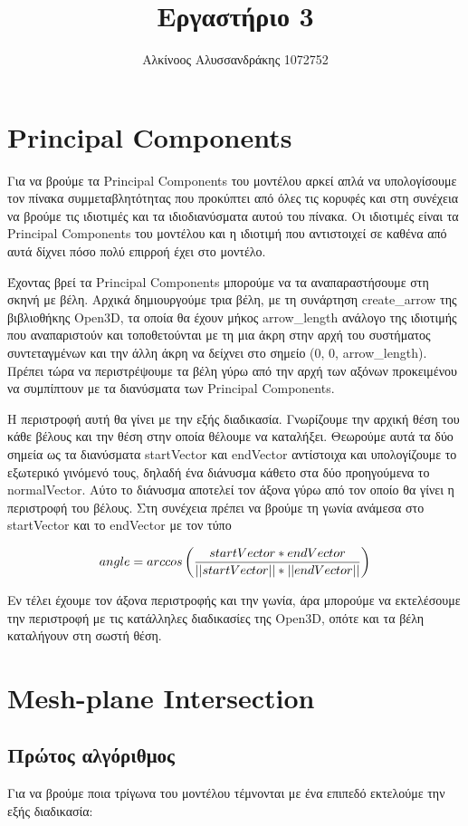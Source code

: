 \documentclass{article}
\title{Εργαστήριο 3}
\author{Αλκίνοος Αλυσσανδράκης 1072752}
\date{}
\begin{document}
\maketitle

\section{Principal Components}
Για να βρούμε τα Principal Components του μοντέλου αρκεί απλά να υπολογίσουμε τον πίνακα
συμμεταβλητότητας που προκύπτει από όλες τις κορυφές και στη συνέχεια να βρούμε τις
ιδιοτιμές και τα ιδιοδιανύσματα αυτού του πίνακα. Οι ιδιοτιμές είναι τα Principal
Components του μοντέλου και η ιδιοτιμή που αντιστοιχεί σε καθένα από αυτά δίχνει πόσο
πολύ επιρροή έχει στο μοντέλο.

Έχοντας βρεί τα Principal Components μπορούμε να τα αναπαραστήσουμε στη σκηνή με βέλη.
Αρχικά δημιουργούμε τρια βέλη, με τη συνάρτηση create\_arrow της βιβλιοθήκης Open3D, τα
οποία θα έχουν μήκος arrow\_length ανάλογο της ιδιοτιμής που αναπαριστούν και
τοποθετούνται με τη μια άκρη στην αρχή του συστήματος συντεταγμένων και την άλλη
άκρη να δείχνει στο σημείο (0, 0, arrow\_length).
Πρέπει τώρα να περιστρέψουμε τα βέλη γύρω από την αρχή των αξόνων προκειμένου να
συμπίπτουν με τα διανύσματα των Principal Components.

Η περιστροφή αυτή θα γίνει με την εξής διαδικασία. Γνωρίζουμε την αρχική θέση του κάθε
βέλους και την θέση στην οποία θέλουμε να καταλήξει. Θεωρούμε αυτά τα δύο σημεία ως τα
διανύσματα startVector και endVector αντίστοιχα και υπολογίζουμε το εξωτερικό γινόμενό
τους, δηλαδή ένα διάνυσμα κάθετο στα δύο προηγούμενα το normalVector.
Αύτο το διάνυσμα αποτελεί τον άξονα γύρω από τον οποίο θα γίνει η περιστροφή του βέλους.
Στη συνέχεια πρέπει να βρούμε τη γωνία ανάμεσα στο startVector και το endVector
με τον τύπο

\[
	angle = arccos\left({startVector*endVector \over ||startVector||*||endVector||}\right)
\]

Εν τέλει έχουμε τον άξονα περιστροφής και την γωνία, άρα μπορούμε να εκτελέσουμε την
περιστροφή με τις κατάλληλες διαδικασίες της Open3D, οπότε και τα βέλη καταλήγουν στη
σωστή θέση.


\section{Mesh-plane Intersection}

\subsection{Πρώτος αλγόριθμος}
Για να βρούμε ποια τρίγωνα του μοντέλου τέμνονται με ένα επιπεδό εκτελούμε την εξής
διαδικασία:
\end{document}
